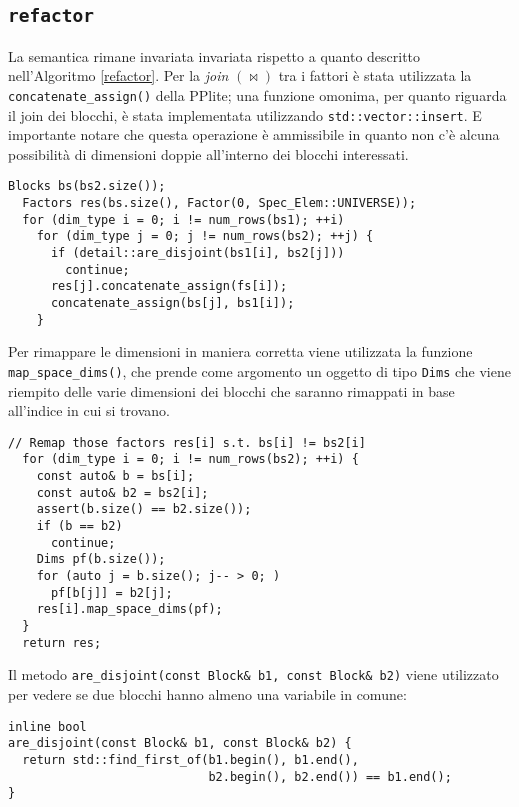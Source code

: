 \documentclass{mimosis}
\theoremstyle{definition}
\begin{document}
\subsection{\texttt{refactor}}
\label{sec:orgbc6b272}
La semantica rimane invariata invariata rispetto a quanto descritto
nell'Algoritmo \ref{refactor}. Per la \emph{join} \((\bowtie)\) tra i fattori è stata
utilizzata la \texttt{concatenate\_assign()} della PPlite; una funzione omonima, per
quanto riguarda il join dei blocchi, è stata implementata utilizzando
\texttt{std::vector::insert}. E importante notare che questa operazione è
ammissibile in quanto non c'è alcuna possibilità di dimensioni doppie
all'interno dei blocchi interessati.

\lstset{style=mystyle,language=C++,label= ,caption= ,captionpos=b,numbers=none}
\begin{lstlisting}
Blocks bs(bs2.size());
  Factors res(bs.size(), Factor(0, Spec_Elem::UNIVERSE));
  for (dim_type i = 0; i != num_rows(bs1); ++i)
    for (dim_type j = 0; j != num_rows(bs2); ++j) {
      if (detail::are_disjoint(bs1[i], bs2[j]))
        continue;
      res[j].concatenate_assign(fs[i]);
      concatenate_assign(bs[j], bs1[i]);
    }
\end{lstlisting}

Per rimappare le dimensioni in maniera corretta viene utilizzata la funzione
\texttt{map\_space\_dims()}, che prende come argomento un oggetto di tipo \texttt{Dims} che
viene riempito delle varie dimensioni dei blocchi che saranno rimappati in base
all'indice in cui si trovano.

\lstset{style=mystyle,language=C++,label= ,caption= ,captionpos=b,numbers=none}
\begin{lstlisting}
// Remap those factors res[i] s.t. bs[i] != bs2[i]
  for (dim_type i = 0; i != num_rows(bs2); ++i) {
    const auto& b = bs[i];
    const auto& b2 = bs2[i];
    assert(b.size() == b2.size());
    if (b == b2)
      continue;
    Dims pf(b.size());
    for (auto j = b.size(); j-- > 0; )
      pf[b[j]] = b2[j];
    res[i].map_space_dims(pf);
  }
  return res;
\end{lstlisting}

Il metodo \texttt{are\_disjoint(const Block\& b1, const Block\& b2)} viene utilizzato per
vedere se due blocchi hanno almeno una variabile in comune:

\lstset{style=mystyle,language=C++,label= ,caption= ,captionpos=b,numbers=none}
\begin{lstlisting}
inline bool
are_disjoint(const Block& b1, const Block& b2) {
  return std::find_first_of(b1.begin(), b1.end(),
                            b2.begin(), b2.end()) == b1.end();
}
\end{lstlisting}
\end{document}
